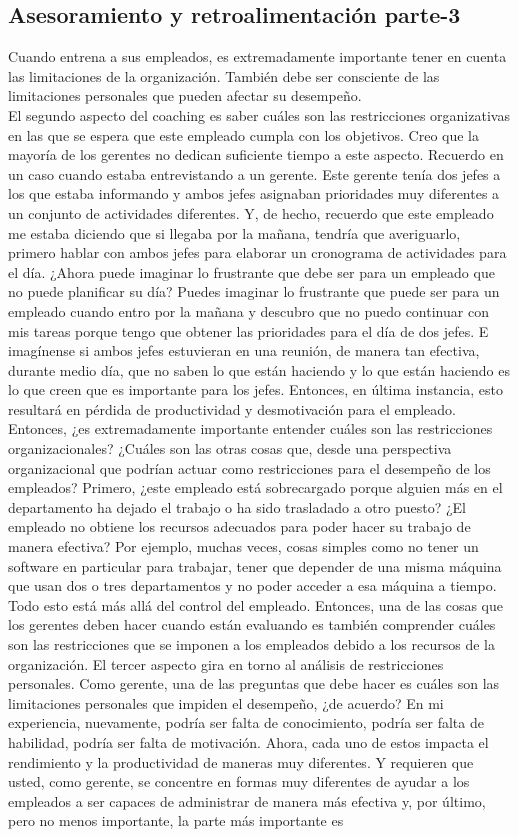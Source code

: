 \documentclass[10pt]{book}
\begin{document}
\subsection{Asesoramiento  y retroalimentación parte-3}
Cuando entrena a sus empleados, es extremadamente importante tener en cuenta las limitaciones de la organización. También debe ser consciente de las limitaciones personales que pueden afectar su desempeño.\\
El segundo aspecto del coaching es saber cuáles son las restricciones organizativas en las que se espera que este empleado cumpla con los objetivos. Creo que la mayoría de los gerentes no dedican suficiente tiempo a este aspecto. Recuerdo en un caso cuando estaba entrevistando a un gerente. Este gerente tenía dos jefes a los que estaba informando y ambos jefes asignaban prioridades muy diferentes a un conjunto de actividades diferentes. Y, de hecho, recuerdo que este empleado me estaba diciendo que si llegaba por la mañana, tendría que averiguarlo, primero hablar con ambos jefes para elaborar un cronograma de actividades para el día. ¿Ahora puede imaginar lo frustrante que debe ser para un empleado que no puede planificar su día? Puedes imaginar lo frustrante que puede ser para un empleado cuando entro por la mañana y descubro que no puedo continuar con mis tareas porque tengo que obtener las prioridades para el día de dos jefes. E imagínense si ambos jefes estuvieran en una reunión, de manera tan efectiva, durante medio día, que no saben lo que están haciendo y lo que están haciendo es lo que creen que es importante para los jefes. Entonces, en última instancia, esto resultará en pérdida de productividad y desmotivación para el empleado. Entonces, ¿es extremadamente importante entender cuáles son las restricciones organizacionales? ¿Cuáles son las otras cosas que, desde una perspectiva organizacional que podrían actuar como restricciones para el desempeño de los empleados? Primero, ¿este empleado está sobrecargado porque alguien más en el departamento ha dejado el trabajo o ha sido trasladado a otro puesto? ¿El empleado no obtiene los recursos adecuados para poder hacer su trabajo de manera efectiva? Por ejemplo, muchas veces, cosas simples como no tener un software en particular para trabajar, tener que depender de una misma máquina que usan dos o tres departamentos y no poder acceder a esa máquina a tiempo. Todo esto está más allá del control del empleado. Entonces, una de las cosas que los gerentes deben hacer cuando están evaluando es también comprender cuáles son las restricciones que se imponen a los empleados debido a los recursos de la organización. El tercer aspecto gira en torno al análisis de restricciones personales. Como gerente, una de las preguntas que debe hacer es cuáles son las limitaciones personales que impiden el desempeño, ¿de acuerdo? En mi experiencia, nuevamente, podría ser falta de conocimiento, podría ser falta de habilidad, podría ser falta de motivación. Ahora, cada uno de estos impacta el rendimiento y la productividad de maneras muy diferentes. Y requieren que usted, como gerente, se concentre en formas muy diferentes de ayudar a los empleados a ser capaces de administrar de manera más efectiva y, por último, pero no menos importante, la parte más importante es 
\end{document}
